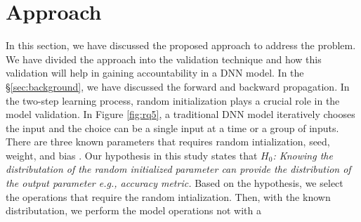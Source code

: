 \section{Approach}
\label{sec:approach}
In this section, we have discussed the proposed approach to address the problem. We have divided the approach into the validation technique and how this validation will help in gaining accountability in a DNN model. In the \S\ref{sec:background}, we have discussed the forward and backward propagation. In the two-step learning process, random initialization plays a crucial role in the model validation. In Figure \ref{fig:rq5}, a traditional DNN model iteratively chooses the input and the choice can be a single input at a time or a group of inputs. There are three known parameters that requires random intialization, seed, weight, and bias \cite{sutskever2013importance}. Our hypothesis in this study states that \emph{$H_0$: Knowing the distributation of the random initialized parameter can provide the distribution of the output parameter e.g., accuracy metric.} Based on the hypothesis, we select the operations that require the random intialization. Then, with the known distributation, we perform the model operations not with a  

